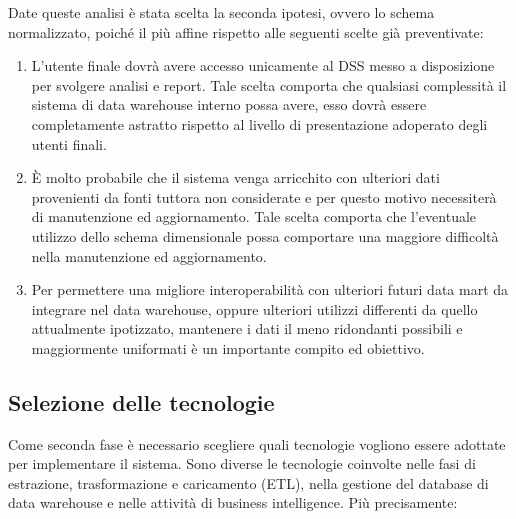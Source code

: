 Date queste analisi è stata scelta la seconda ipotesi, ovvero lo schema normalizzato, poiché il più affine rispetto alle seguenti scelte già preventivate:

\begin{enumerate}
    \item L'utente finale dovrà avere accesso unicamente al DSS messo a disposizione per svolgere analisi e report. Tale scelta comporta che qualsiasi complessità il sistema di data warehouse interno possa avere, esso dovrà essere completamente astratto rispetto al livello di presentazione adoperato degli utenti finali.
    \item È molto probabile che il sistema venga arricchito con ulteriori dati provenienti da fonti tuttora non considerate e per questo motivo necessiterà di manutenzione ed aggiornamento. Tale scelta comporta che l'eventuale utilizzo dello schema dimensionale possa comportare una maggiore difficoltà nella manutenzione ed aggiornamento.
    \item Per permettere una migliore interoperabilità con ulteriori futuri data mart da integrare nel data warehouse, oppure ulteriori utilizzi differenti da quello attualmente ipotizzato, mantenere i dati il meno ridondanti possibili e maggiormente uniformati è un importante compito ed obiettivo.
\end{enumerate}


\subsection{Selezione delle tecnologie}

Come seconda fase è necessario scegliere quali tecnologie vogliono essere adottate per implementare il sistema. Sono diverse le tecnologie coinvolte nelle fasi di estrazione, trasformazione e caricamento (ETL), nella gestione del database di data warehouse e nelle attività di business intelligence. Più precisamente:

